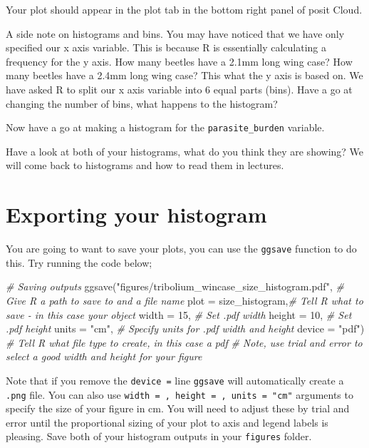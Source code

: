\documentclass[
]{book}
\newenvironment{Shaded}{\begin{snugshade}}{\end{snugshade}}
\newcommand{\AttributeTok}[1]{\textcolor[rgb]{0.77,0.63,0.00}{#1}}
\newcommand{\CommentTok}[1]{\textcolor[rgb]{0.56,0.35,0.01}{\textit{#1}}}
\newcommand{\DecValTok}[1]{\textcolor[rgb]{0.00,0.00,0.81}{#1}}
\newcommand{\FunctionTok}[1]{\textcolor[rgb]{0.00,0.00,0.00}{#1}}
\newcommand{\NormalTok}[1]{#1}
\newcommand{\StringTok}[1]{\textcolor[rgb]{0.31,0.60,0.02}{#1}}
\begin{document}
Your plot should appear in the plot tab in the bottom right panel of posit Cloud.

A side note on histograms and bins. You may have noticed that we have only specified our x axis variable. This is because R is essentially calculating a frequency for the y axis. How many beetles have a 2.1mm long wing case? How many beetles have a 2.4mm long wing case? This what the y axis is based on. We have asked R to split our x axis variable into 6 equal parts (bins). Have a go at changing the number of bins, what happens to the histogram?

Now have a go at making a histogram for the \texttt{parasite\_burden} variable.

Have a look at both of your histograms, what do you think they are showing? We will come back to histograms and how to read them in lectures.

\hypertarget{export}{%
\section{Exporting your histogram}\label{export}}

You are going to want to save your plots, you can use the \texttt{ggsave} function to do this. Try running the code below;

\begin{Shaded}
\begin{Highlighting}[]
\CommentTok{\# Saving outputs}
\FunctionTok{ggsave}\NormalTok{(}\StringTok{"figures/tribolium\_wincase\_size\_histogram.pdf"}\NormalTok{, }\CommentTok{\# Give R a path to save to and a file name}
       \AttributeTok{plot =}\NormalTok{ size\_histogram,}\CommentTok{\# Tell R what to save {-} in this case your object}
       \AttributeTok{width =} \DecValTok{15}\NormalTok{, }\CommentTok{\# Set .pdf width}
       \AttributeTok{height =} \DecValTok{10}\NormalTok{, }\CommentTok{\# Set .pdf height}
       \AttributeTok{units =} \StringTok{"cm"}\NormalTok{, }\CommentTok{\# Specify units for .pdf width and height}
       \AttributeTok{device =} \StringTok{"pdf"}\NormalTok{) }\CommentTok{\# Tell R what file type to create, in this case a pdf}
\CommentTok{\# Note, use trial and error to select a good width and height for your figure}
\end{Highlighting}
\end{Shaded}

Note that if you remove the \texttt{device\ =} line \texttt{ggsave} will automatically create a \texttt{.png} file. You can also use \texttt{width\ =\ ,\ height\ =\ ,\ units\ =\ "cm"} arguments to specify the size of your figure in cm. You will need to adjust these by trial and error until the proportional sizing of your plot to axis and legend labels is pleasing. Save both of your histogram outputs in your \texttt{figures} folder.
\end{document}
